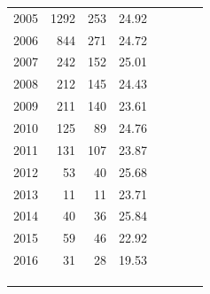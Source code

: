 \documentclass[12pt,]{article}
\begin{document}
\begin{table}[ht]
\begin{tabular}{rrrrllll}
  2005 & 1292 & 253 & 24.92 &  &  &  &  \\ 
  2006 & 844 & 271 & 24.72 &  &  &  &  \\ 
  2007 & 242 & 152 & 25.01 &  &  &  &  \\ 
  2008 & 212 & 145 & 24.43 &  &  &  &  \\ 
  2009 & 211 & 140 & 23.61 &  &  &  &  \\ 
  2010 & 125 &  89 & 24.76 &  &  &  &  \\ 
  2011 & 131 & 107 & 23.87 &  &  &  &  \\ 
  2012 &  53 &  40 & 25.68 &  &  &  &  \\ 
  2013 &  11 &  11 & 23.71 &  &  &  &  \\ 
  2014 &  40 &  36 & 25.84 &  &  &  &  \\ 
  2015 &  59 &  46 & 22.92 &  &  &  &  \\ 
  2016 &  31 &  28 & 19.53 &  &  &  &  \\ 
   &  &  &  &  &  &  &  \\ 
   &  &  &  &  &  &  &  \\ 
   &  &  &  &  &  &  &  \\ 
   \hline
\end{tabular}
\end{table}

\FloatBarrier
\end{document}
